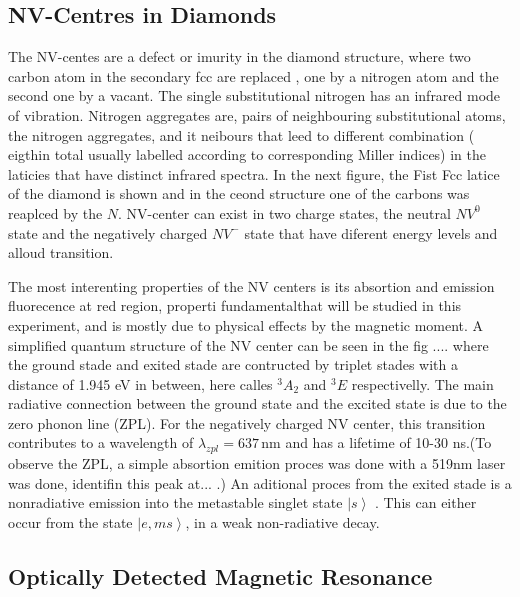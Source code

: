 \subsection{NV-Centres in Diamonds}
 The NV-centes are a defect or imurity in the diamond structure, where two carbon atom in the secondary fcc are replaced , one by a nitrogen atom and the second one by a  vacant. The single substitutional nitrogen has an infrared mode of vibration. Nitrogen aggregates are, pairs of neighbouring substitutional atoms, the nitrogen aggregates, and it neibours that leed to different combination ( eigthin total usually labelled according to corresponding Miller indices) in the laticies that have distinct infrared spectra. In the next figure, the Fist Fcc latice of the diamond is shown and in the ceond structure one of the carbons was reaplced by the $N$. NV-center can exist in two charge states, the neutral $NV^{0}$ state and the negatively charged $NV^{-}$ state that have diferent energy levels and alloud transition.
 
The most interenting properties of the NV centers is its absortion and emission fluorecence at red region, properti fundamentalthat will be studied in this experiment, and is mostly due to physical effects by the magnetic moment. A simplified quantum structure of the NV center can be seen in the fig .... where the ground stade and exited stade are contructed by triplet stades with a distance of 1.945 eV in between, here calles $^{3}A_{2}$ and $^{3}E$  respectivelly. The main radiative connection between the ground state and the excited state is due to the zero phonon line (ZPL). For the negatively charged NV center, this transition contributes to a wavelength of $\lambda_{zpl} = 637\,\mathrm{nm}$ and has a lifetime of 10-30 ns.(To observe the ZPL, a simple absortion emition proces was done with a 519nm laser was done, identifin this peak at... .) 
An aditional proces from the exited stade is a nonradiative emission into the metastable singlet state $\left|s\right\rangle$ . This can either occur from the state $\left| e,ms\right\rangle$, in a weak non-radiative decay.


\subsection{Optically Detected Magnetic Resonance}

